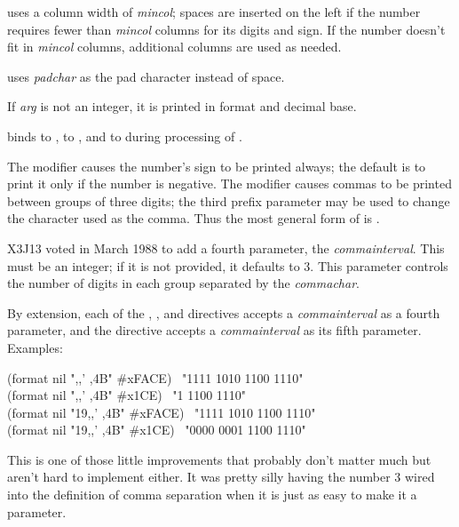 \begin{flushdesc}
 uses a column width of \emph{mincol}; spaces are inserted on
the left if the number requires fewer than \emph{mincol} columns for its digits
and sign.  If the number doesn't fit in \emph{mincol} columns, additional columns
are used as needed.

 uses \emph{padchar} as the pad character
instead of space.

If \emph{arg} is not an integer, it is printed
in  format and decimal base.

 binds 
to ,  to , and  to 
during processing of .

The \cd{{\Xatsign}} modifier causes the number's sign to be printed always; the default
is to print it only if the number is negative.
The \cd{:} modifier causes commas to be printed between groups of three digits;
the third prefix parameter may be used to change the character used as the comma.
Thus the most general form of  is
.

\begin{new}
X3J13 voted in March 1988
to add a fourth parameter, the \emph{commainterval}.
This must be an integer; if it is not provided,
it defaults to 3.  This parameter controls the number of digits in each
group separated by the \emph{commachar}.

By extension, each of the , , and  directives
accepts a \emph{commainterval} as a fourth parameter,
and the  directive accepts a \emph{commainterval} as its fifth parameter.
Examples:
\begin{lisp}
(format nil "{\Xtilde},,' ,4B" \#xFACE) \EV\ "1111 1010 1100 1110" \\
(format nil "{\Xtilde},,' ,4B" \#x1CE) \EV\ "1 1100 1110" \\
(format nil "{\Xtilde}19,,' ,4B" \#xFACE) \EV\ "1111 1010 1100 1110" \\
(format nil "{\Xtilde}19,,' ,4B" \#x1CE) \EV\ "0000 0001 1100 1110"
\end{lisp}
This is one of those little improvements that probably don't matter much
but aren't hard to implement either.  It was pretty silly having the number 3 wired
into the definition of comma separation when it is just as easy to make it
a parameter.
\end{new}


\end{flushdesc}

